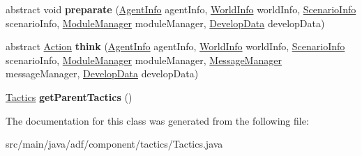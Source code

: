 \begin{DoxyCompactItemize}
\item 
\hypertarget{classadf_1_1component_1_1tactics_1_1Tactics_ad553c6f61e207d2f52900a9f84b9a1af}{}\label{classadf_1_1component_1_1tactics_1_1Tactics_ad553c6f61e207d2f52900a9f84b9a1af} 
abstract void {\bfseries preparate} (\hyperlink{classadf_1_1agent_1_1info_1_1AgentInfo}{Agent\+Info} agent\+Info, \hyperlink{classadf_1_1agent_1_1info_1_1WorldInfo}{World\+Info} world\+Info, \hyperlink{classadf_1_1agent_1_1info_1_1ScenarioInfo}{Scenario\+Info} scenario\+Info, \hyperlink{classadf_1_1agent_1_1module_1_1ModuleManager}{Module\+Manager} module\+Manager, \hyperlink{classadf_1_1agent_1_1develop_1_1DevelopData}{Develop\+Data} develop\+Data)
\item 
\hypertarget{classadf_1_1component_1_1tactics_1_1Tactics_a696ecad03db5a993c63ef8bfb082297b}{}\label{classadf_1_1component_1_1tactics_1_1Tactics_a696ecad03db5a993c63ef8bfb082297b} 
abstract \hyperlink{classadf_1_1agent_1_1action_1_1Action}{Action} {\bfseries think} (\hyperlink{classadf_1_1agent_1_1info_1_1AgentInfo}{Agent\+Info} agent\+Info, \hyperlink{classadf_1_1agent_1_1info_1_1WorldInfo}{World\+Info} world\+Info, \hyperlink{classadf_1_1agent_1_1info_1_1ScenarioInfo}{Scenario\+Info} scenario\+Info, \hyperlink{classadf_1_1agent_1_1module_1_1ModuleManager}{Module\+Manager} module\+Manager, \hyperlink{classadf_1_1agent_1_1communication_1_1MessageManager}{Message\+Manager} message\+Manager, \hyperlink{classadf_1_1agent_1_1develop_1_1DevelopData}{Develop\+Data} develop\+Data)
\item 
\hypertarget{classadf_1_1component_1_1tactics_1_1Tactics_a66da6efad00dd811eeaa860221272037}{}\label{classadf_1_1component_1_1tactics_1_1Tactics_a66da6efad00dd811eeaa860221272037} 
\hyperlink{classadf_1_1component_1_1tactics_1_1Tactics}{Tactics} {\bfseries get\+Parent\+Tactics} ()
\end{DoxyCompactItemize}


The documentation for this class was generated from the following file\+:\begin{DoxyCompactItemize}
\item 
src/main/java/adf/component/tactics/Tactics.\+java\end{DoxyCompactItemize}
